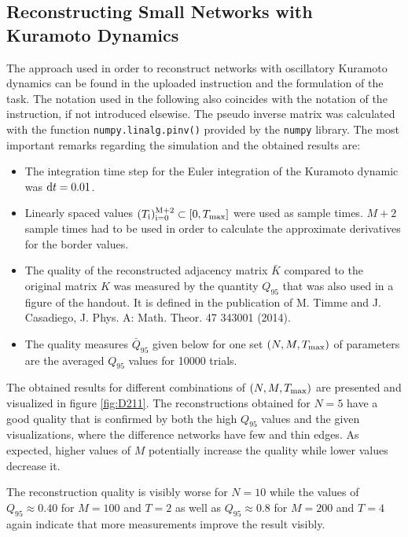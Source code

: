 \documentclass{scrartcl}
\begin{document}
\subsection{Reconstructing Small Networks with Kuramoto Dynamics}
The approach used in order to reconstruct networks with oscillatory
Kuramoto dynamics can be found in the uploaded instruction and the
formulation of the task. The notation used in the following also coincides
with the notation of the instruction, if not introduced elsewise. The
pseudo inverse matrix was calculated with the function
\texttt{numpy.linalg.pinv()} provided by the \texttt{numpy} library.
The most important remarks regarding the simulation and the obtained
results are:
\begin{itemize}
    \item The integration time step for the Euler integration of the
        Kuramoto dynamic was $\mathrm{d} t = 0.01$.
    \item Linearly spaced values $(T_{\mathrm{i}})_{\mathrm{i=0}}^{\mathrm{M+2}} \subset [0,
        T_{\mathrm{max}}]$ were used as sample times. $M+2$ sample times had to be
        used in order to calculate the approximate derivatives for the border values. 
    \item The quality of the reconstructed adjacency matrix $\bar{K}$
        compared to the original matrix $K$ was measured by the quantity $Q_{95}$
        that was also used in a figure of the handout. It is defined
        in the publication of M. Timme and J. Casadiego, J. Phys. A: Math.
        Theor. 47 343001 (2014).
    \item The quality measures $\bar{Q}_{95}$ given below for one set $(N,
        M, T_{\mathrm{max}})$ of parameters are the averaged $Q_{95}$ values for
        10000 trials.
\end{itemize}

The obtained results for different combinations of $(N, M, T_{\mathrm{max}})$ are
presented and visualized in figure \ref{fig:D211}. The reconstructions
obtained for $N = 5$ have a good quality that is confirmed by both the high
$Q_{95}$ values and the given visualizations, where the difference networks
have few and thin edges. As expected, higher values of $M$ potentially
increase the quality while lower values decrease it.

The reconstruction quality is visibly worse for $N = 10$ while the values
of $Q_{95} \approx 0.40$ for $M = 100$ and $T = 2$ as well as
$Q_{95}\approx 0.8$ for $M = 200$ and $T = 4$ again indicate that more
measurements improve the result visibly.
\end{document}

